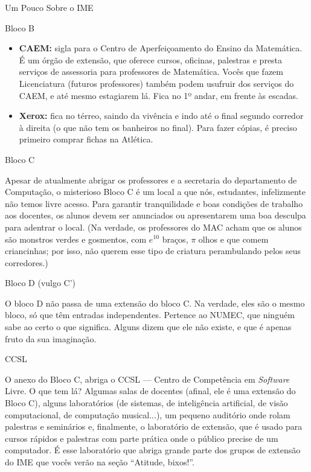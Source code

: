 \begin{secao}{Um Pouco Sobre o IME}
\begin{subsecao}{Bloco B}
\begin{itemize}
\item {\bf CAEM:} sigla para o Centro de Aperfeiçoamento do Ensino da
  Matemática. É um órgão de extensão, que oferece cursos, oficinas, palestras e
  presta serviços de assessoria para professores de Matemática. Vocês que fazem
  Licenciatura (futuros professores) também podem usufruir dos serviços do CAEM,
  e até mesmo estagiarem lá. Fica no 1º andar, em frente às escadas.

\item{\bf Xerox:} fica no térreo, saindo da vivência e indo até o final segundo
  corredor à direita (o que não tem os banheiros no final). Para fazer cópias,
  é preciso primeiro comprar fichas na Atlética.
\end{itemize}



\end{subsecao}

\begin{subsecao}{Bloco C}

Apesar de atualmente abrigar os professores e a secretaria do departamento de
Computação, o misterioso Bloco C é um local a que nós, estudantes, infelizmente não
temos livre acesso. Para garantir tranquilidade e boas condições de trabalho aos
docentes, os alunos devem ser anunciados ou apresentarem uma boa desculpa para
adentrar o local. (Na verdade, os professores do MAC acham que os alunos são monstros
verdes e gosmentos, com $e^{10}$ braços, $\pi$ olhos e que comem criancinhas;
por isso, não querem esse tipo de criatura perambulando pelos seus corredores.)

\end{subsecao}

\begin{subsecao}{Bloco D (vulgo C')}

O bloco D não passa de uma extensão do bloco C. Na verdade, eles são o mesmo bloco,
só que têm entradas independentes. Pertence ao NUMEC, que ninguém sabe ao certo
o que significa. Alguns dizem que ele não existe, e que é apenas fruto da sua
imaginação.

\end{subsecao}

\begin{subsecao}{CCSL}

O anexo do Bloco C, abriga o CCSL --- Centro de Competência em \textit{Software}
Livre. O que tem lá? Algumas salas de docentes (afinal, ele é uma extensão do
Bloco C), alguns laboratórios (de sistemas, de inteligência artificial,
de visão computacional, de computação musical...), um pequeno auditório
onde rolam palestras e seminários e, finalmente, o laboratório de extensão,
que é usado para cursos rápidos e palestras com parte prática onde o público
precise de um computador. É esse laboratório que abriga grande parte dos grupos
de extensão do IME que vocês verão na seção ``Atitude, bixos!''.


\end{subsecao}
\end{secao}

